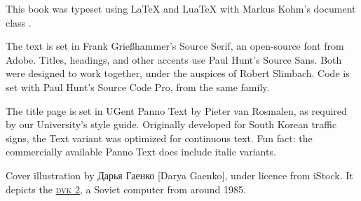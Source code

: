 \documentclass[main]{subfiles}
\begin{document}
\vspace*{\fill}

\begin{small}
    This book was typeset using {\LaTeX} and {Lua\TeX} with Markus Kohm's document class {\KOMAScript}.

    The text is set in Frank Grießhammer's Source Serif, an open-source font from Adobe.
    Titles, headings, and other accents use Paul Hunt's {\sffamily Source Sans}.
    Both were designed to work together, under the auspices of Robert Slimbach.
    Code is set with Paul Hunt's {\ttfamily Source Code Pro}, from the same family.

    The title page is set in {\panno\selectfont UGent Panno Text} by Pieter van Rosmalen,
    as required by our University's style guide.
    Originally developed for South Korean traffic signs, the Text variant was optimized for continuous text.
    Fun fact: the commercially available Panno Text does include italic variants.

    Cover illustration by Дарья Гаенко [Darya Gaenko], under licence from iStock.
    It depicts the \href{http://www.leningrad.su/museum/show_big.php?n=1189}{\textsc{dvk} 2}, a Soviet computer from around 1985.
\end{small}
\end{document}
